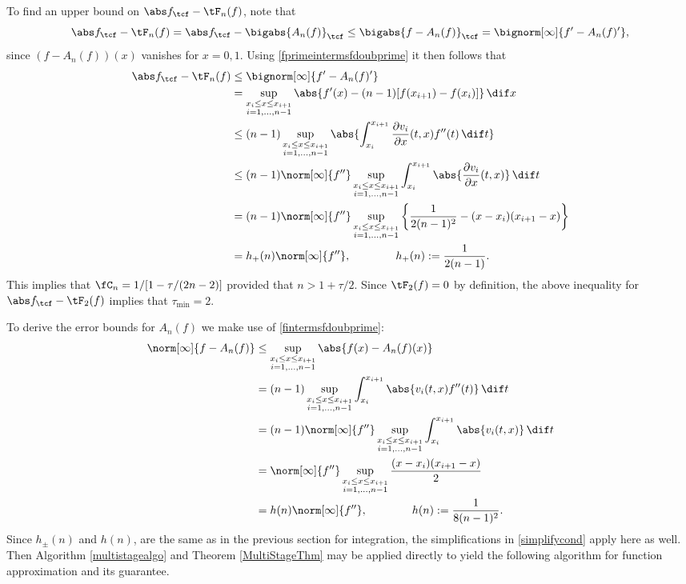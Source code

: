 To find an upper bound on $\Ftnorm{f}-\tF_{n}(f)$, note that
\begin{equation*}
\Ftnorm{f} - \tF_{n}(f) = \Ftnorm{f} - \bigabs{A_n(f)}_{\tcf} \le \bigabs{f-A_n(f)}_{\tcf} = \bignorm[\infty]{f' -A_n(f)'},
\end{equation*}
since $(f-A_n(f))(x)$ vanishes for $x=0,1$. Using \eqref{fprimeintermsfdoubprime} it then follows that
\begin{align*}
\Ftnorm{f} - \tF_{n}(f) & \le \bignorm[\infty]{f' -A_n(f)'} \\
& = \sup_{\substack{x_i \le x \le x_{i+1}\\ i=1, \ldots, n-1 }} \abs{f'(x) -(n-1)[f(x_{i+1})-f(x_i)]} \, \dif x \\
&\le(n-1) \sup_{\substack{x_i \le x \le x_{i+1}\\ i=1, \ldots, n-1 }} \abs{ \int_{x_i}^{x_{i+1}} \frac{\partial v_i}{\partial x}(t,x) f''(t) \, \dif t} \\
& \le (n-1) \norm[\infty]{f''} \sup_{\substack{x_i \le x \le x_{i+1}\\ i=1, \ldots, n-1 }} \int_{x_i}^{x_{i+1}} \abs{\frac{\partial v_i}{\partial x}(t,x)} \, \dif t \\
&=(n-1)\norm[\infty]{f''} \sup_{\substack{x_i \le x \le x_{i+1}\\ i=1, \ldots, n-1 }} \left \{\frac{1}{2(n-1)^2} - (x-x_i)(x_{i+1}-x) \right\} \\
&= h_+(n) \norm[\infty]{f''}, \qquad \qquad  h_+(n):= \frac{1}{2(n-1)}.
\end{align*}
This implies that $\fC_n =1/[1 - \tau /(2n-2)]$ provided that $n>1+\tau/2$.
Since $\tF_2(f)=0$ by definition, the above inequality for $\Ftnorm{f} - \tF_{2}(f)$ implies that $\tau_{\min}=2$.

To derive the error bounds for $A_n(f)$ we make use of \eqref{fintermsfdoubprime}:
\begin{align*}
\norm[\infty]{f-A_n(f)}
& \le \sup_{\substack{x_i \le x \le x_{i+1}\\ i=1, \ldots, n-1 }} \abs{f(x)-A_n (f)(x)}\\
&= (n-1)\sup_{\substack{x_i \le x \le x_{i+1}\\ i=1, \ldots, n-1 }}  \int_{x_i}^{x_{i+1}} \abs{v_i(t,x) f''(t)} \, \dif t\\
&= (n-1)\norm[\infty]{f''} \sup_{\substack{x_i \le x \le x_{i+1}\\ i=1, \ldots, n-1 }}  \int_{x_i}^{x_{i+1}} \abs{v_i(t,x)} \, \dif t\\
&=\norm[\infty]{f''} \sup_{\substack{x_i \le x \le x_{i+1}\\ i=1, \ldots, n-1 }}  \frac{(x-x_i)(x_{i+1}-x)}2 \\
&= h(n) \norm[\infty]{f''}, \qquad \qquad  h(n):= \frac{1}{8(n-1)^2}.
\end{align*}
Since $h_{\pm}(n)$ and $h(n)$, are the same as in the previous section for integration, the simplifications in \eqref{simplifycond} apply here as well.  Then Algorithm \ref{multistagealgo} and Theorem \ref{MultiStageThm} may be applied directly to  yield the following algorithm for function approximation and its guarantee.

